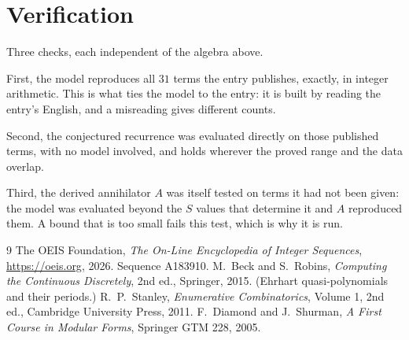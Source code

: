 \documentclass[11pt,a4paper]{article}
\theoremstyle{plain}
\theoremstyle{definition}
\begin{document}
\section{Verification}

Three checks, each independent of the algebra above.

First, the model reproduces all $31$ terms the entry publishes, exactly, in integer
arithmetic. This is what ties the model to the entry: it is built by reading the entry's
English, and a misreading gives different counts.

Second, the conjectured recurrence was evaluated directly on those published terms, with no
model involved, and holds wherever the proved range and the data overlap.

Third, the derived annihilator $A$ was itself tested on terms it had not been given: the model
was evaluated beyond the $S$ values that determine it and $A$ reproduced them. A bound that is
too small fails this test, which is why it is run.

\begin{thebibliography}{9}
 The OEIS Foundation, \emph{The On-Line Encyclopedia of Integer
Sequences}, \url{https://oeis.org}, 2026. Sequence A183910.
 M.~Beck and S.~Robins, \emph{Computing the Continuous Discretely},
2nd ed., Springer, 2015. (Ehrhart quasi-polynomials and their periods.)
 R.~P.~Stanley, \emph{Enumerative Combinatorics}, Volume 1, 2nd ed.,
Cambridge University Press, 2011.
 F.~Diamond and J.~Shurman, \emph{A First Course in Modular Forms},
Springer GTM 228, 2005.
\end{thebibliography}
\end{document}
